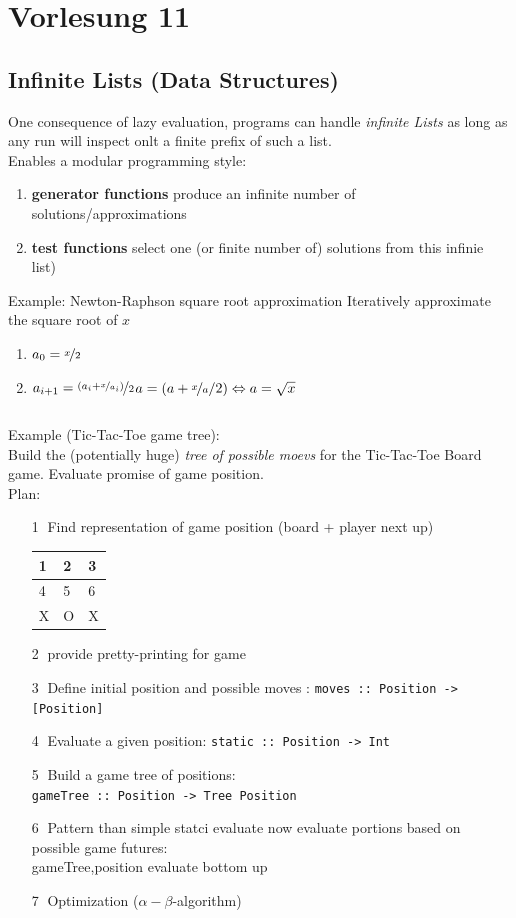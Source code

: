 \documentclass{article}
\newcommand{\Haskell}[1]{\texttt{#1}}
\begin{document}
\section{Vorlesung 11}
\subsection{Infinite Lists (Data Structures)}
One consequence of lazy evaluation, programs can handle \emph{infinite Lists} as long as any run will inspect onlt a finite prefix of such a list.\\
Enables a modular programming style:\\
\begin{enumerate}
\item \textbf{generator functions} produce an infinite number of solutions/approximations
\item \textbf{test functions} select one (or finite number of) solutions from this infinie list)
\end{enumerate}
Example: Newton-Raphson square root approximation
Iteratively approximate the square root of $x$
\begin{enumerate}
\item $a_0 = \nicefrac{x}{2}$
\item $a_{i+1} = \nicefrac{(a_i + \nicefrac{x}{a_i})}{2}$\hfill$a = (a + \nicefrac{x}{a}/2) \Leftrightarrow a = \sqrt{x}$
\end{enumerate}
\inputminted{Haskell}{sqrt.hs}
Example (Tic-Tac-Toe game tree):\\
Build the (potentially huge) \emph{tree of possible moevs} for the Tic-Tac-Toe Board game. Evaluate promise of game position.\\
Plan:\\
\begin{enumerate}
\item[\textcircled{1}] Find representation of game position (board + player next up)\\
\begin{tabular}{|l|l|l|}
\hline
1&2&3 \\ \hline
4&5&6 \\ \hline
X&O&X \\ \hline
\end{tabular}
\item[\textcircled{2}]provide pretty-printing for game
\item[\textcircled{3}]Define initial position and possible moves : \Haskell{moves :: Position -> [Position]}
\item[\textcircled{4}] Evaluate a given position: \Haskell{static :: Position -> Int}
\item[\textcircled{5}] Build a game tree of positions:\\
\Haskell{gameTree :: Position -> Tree Position}
\item[\textcircled{6}] Pattern than simple statci evaluate now evaluate portions based on possible game futures:\\
gameTree,position evaluate bottom up
\item[\textcircled{7}] Optimization ($\alpha-\beta$-algorithm)
\end{enumerate}
\inputminted{Haskell}{tic-tac-toe.hs}
\clearpage
\end{document}
